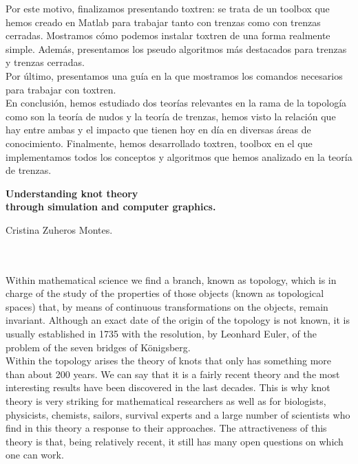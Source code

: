 Por este motivo, finalizamos presentando toxtren: se trata de un toolbox que hemos creado en Matlab para trabajar tanto con trenzas como con trenzas cerradas. Mostramos cómo podemos instalar toxtren de una forma realmente simple. Además, presentamos los pseudo algoritmos más destacados para trenzas y trenzas cerradas.\\
Por último, presentamos una guía en la que mostramos los comandos necesarios para trabajar con toxtren. \\

En conclusión, hemos estudiado dos teorías relevantes en la rama de la topología como son la teoría de nudos y la teoría de trenzas, hemos visto la relación que hay entre ambas y el impacto que tienen hoy en día en diversas áreas de conocimiento. Finalmente, hemos desarrollado toxtren, toolbox en el que implementamos todos los conceptos y algoritmos que hemos analizado en la teoría de trenzas. 

 
\cleardoublepage


\thispagestyle{empty}

\begin{center}
{\large\bfseries Understanding knot theory \\
	through simulation and computer graphics.}\\
\end{center}
\begin{center}
Cristina Zuheros Montes.\\
\end{center}

\\

\vspace{0.7cm}
\\
Within mathematical science we find a branch, known as topology, which is in charge of the study of the properties of those objects (known as topological spaces) that, by means of continuous transformations on the objects, remain invariant. Although an exact date of the origin of the topology is not known, it is usually established in 1735 with the resolution, by Leonhard Euler, of the problem of the seven bridges of Königsberg.\\


Within the topology arises the theory of knots that only has something more than about 200 years. We can say that it is a fairly recent theory and the most interesting results have been discovered in the last decades. This is why knot theory is very striking for mathematical researchers as well as for biologists, physicists, chemists, sailors, survival experts and a large number of scientists who find in this theory a response to their approaches. The attractiveness of this theory is that, being relatively recent, it still has many open questions on which one can work.\\






